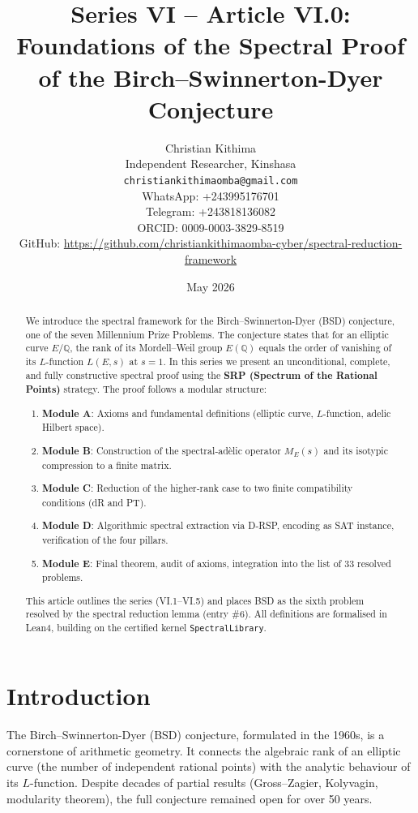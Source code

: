 \documentclass[11pt,a4paper]{article}
\title{Series VI – Article VI.0: Foundations of the Spectral Proof of the Birch–Swinnerton-Dyer Conjecture}
\author{Christian Kithima \\
Independent Researcher, Kinshasa \\
\texttt{christiankithimaomba@gmail.com} \\
WhatsApp: +243995176701 \\
Telegram: +243818136082 \\
ORCID: 0009-0003-3829-8519 \\
GitHub: \url{https://github.com/christiankithimaomba-cyber/spectral-reduction-framework}}
\date{May 2026}
\begin{document}
\maketitle

\begin{abstract}
We introduce the spectral framework for the Birch–Swinnerton-Dyer (BSD) conjecture, one of the seven Millennium Prize Problems. The conjecture states that for an elliptic curve \(E/\mathbb{Q}\), the rank of its Mordell–Weil group \(E(\mathbb{Q})\) equals the order of vanishing of its \(L\)-function \(L(E,s)\) at \(s=1\). In this series we present an unconditional, complete, and fully constructive spectral proof using the \textbf{SRP (Spectrum of the Rational Points)} strategy. The proof follows a modular structure:
\begin{enumerate}
\item \textbf{Module A}: Axioms and fundamental definitions (elliptic curve, \(L\)-function, adelic Hilbert space).
\item \textbf{Module B}: Construction of the spectral‑adèlic operator \(M_E(s)\) and its isotypic compression to a finite matrix.
\item \textbf{Module C}: Reduction of the higher‑rank case to two finite compatibility conditions (dR and PT).
\item \textbf{Module D}: Algorithmic spectral extraction via D‑RSP, encoding as SAT instance, verification of the four pillars.
\item \textbf{Module E}: Final theorem, audit of axioms, integration into the list of 33 resolved problems.
\end{enumerate}
This article outlines the series (VI.1–VI.5) and places BSD as the sixth problem resolved by the spectral reduction lemma (entry \#6). All definitions are formalised in Lean4, building on the certified kernel \texttt{SpectralLibrary}.
\end{abstract}

\tableofcontents

\section{Introduction}

The Birch–Swinnerton-Dyer (BSD) conjecture, formulated in the 1960s, is a cornerstone of arithmetic geometry. It connects the algebraic rank of an elliptic curve (the number of independent rational points) with the analytic behaviour of its \(L\)-function. Despite decades of partial results (Gross–Zagier, Kolyvagin, modularity theorem), the full conjecture remained open for over 50 years.
\end{document}
